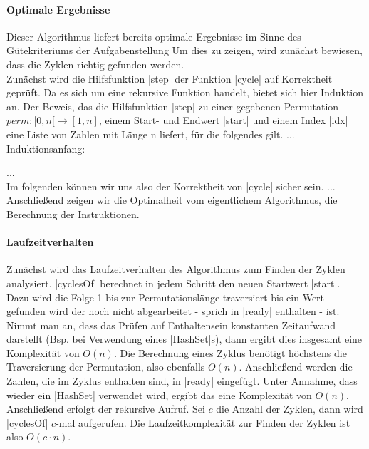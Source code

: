 \paragraph{Optimale Ergebnisse}
\label{opt_res}
Dieser Algorithmus liefert bereits optimale Ergebnisse im Sinne des Gütekriteriums der Aufgabenstellung
Um dies zu zeigen, wird zunächst bewiesen, dass die Zyklen richtig gefunden werden. \\
Zunächst wird die Hilfsfunktion |step| der Funktion |cycle| auf Korrektheit geprüft. Da es sich um eine rekursive Funktion handelt, bietet sich hier Induktion an.
Der Beweis, das die Hilfsfunktion |step| zu einer gegebenen Permutation $perm: [0,n[ \rightarrow [1,n]$, einem Start- und Endwert |start| und einem Index |idx|
eine Liste von Zahlen mit Länge n liefert, für die folgendes gilt. ... \\
Induktionsanfang:

... \\
Im folgenden können wir uns also der Korrektheit von |cycle| sicher sein. 
... \\
Anschließend zeigen wir die Optimalheit vom eigentlichem Algorithmus, die Berechnung der Instruktionen.

\paragraph{Laufzeitverhalten}
Zunächst wird das Laufzeitverhalten des Algorithmus zum Finden der Zyklen analysiert.
|cyclesOf| berechnet in jedem Schritt den neuen Startwert |start|.
Dazu wird die Folge 1 bis zur Permutationslänge traversiert bis ein Wert gefunden wird der noch nicht abgearbeitet - sprich in |ready| enthalten - ist.
Nimmt man an, dass das Prüfen auf Enthaltensein konstanten Zeitaufwand darstellt (Bsp. bei Verwendung eines |HashSet|s), dann ergibt dies insgesamt eine Komplexität von $O(n)$.
Die Berechnung eines Zyklus benötigt höchstens die Traversierung der Permutation, also ebenfalls $O(n)$. %
Anschließend werden die Zahlen, die im Zyklus enthalten sind, in |ready| eingefügt. Unter Annahme, dass wieder ein |HashSet| verwendet wird, ergibt das eine Komplexität von $O(n)$.
Anschließend erfolgt der rekursive Aufruf. Sei $c$ die Anzahl der Zyklen, dann wird |cyclesOf| $c$-mal aufgerufen.
Die Laufzeitkomplexität zur Finden der Zyklen ist also $O(c \cdot n)$. \\

